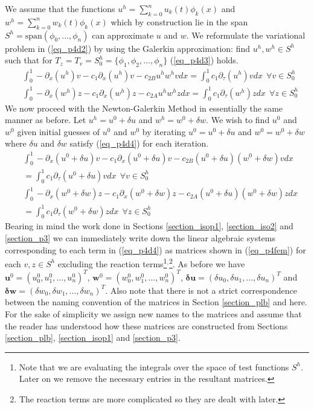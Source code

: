 \documentclass[11pt,fleqn]{article}
\theoremstyle{defstyle}
\begin{document}
We assume that the functions $u^h =\sum^n_{k=0} u_k(t) \phi_k(x)$ and $w^h =\sum^n_{k=0} w_k(t) \phi_k(x)$ which by construction lie in the span $S^h=\text{span}(\phi_0,...,\phi_n)$ can approximate $u$ and $w$. We reformulate the variational problem in (\ref{eq_p4d2}) by using the Galerkin approximation: find $u^h, w^h \in S^h$ such that for $T_z = T_v = S^h_0=\{\phi_1, \phi_2,...,\phi_n \}$ (\ref{eq_p4d3}) holds.
\begin{equation}
\begin{aligned}
&\int_0^1 -\partial_{x}(u^h)v - c_1\partial_x(u^h)v - c_{2B}u^hw^hvdx = \int_0^1 c_1\partial_\tau(u^h)v dx~~\forall v \in S^h_0 \\
&\int_0^1-\partial_{x}(w^h)z - c_1\partial_x(w^h)z - c_{2A}u^hw^hzdx = \int_0^1 c_1\partial_\tau(w^h)zdx~~\forall z \in S^h_0 
\end{aligned}
\label{eq_p4d3}
\end{equation}
We now proceed with the Newton-Galerkin Method in essentially the same manner as before. Let $u^h = u^0 + \delta u$ and $w^h=w^0 +\delta w$. We wish to find $u^0$ and $w^0$ given initial guesses of $u^0$ and $w^0$ by iterating $u^0 = u^0 + \delta u$ and $w^0=w^0+\delta w$ where $\delta u$ and $\delta w$ satisfy (\ref{eq_p4d4}) for each iteration.
\begin{equation}
\begin{aligned}
&\int_0^1 -\partial_{x}(u^0 + \delta u)v - c_1\partial_x(u^0 + \delta u)v - c_{2B}(u^0 + \delta u)(w^0 +\delta w)vdx \\ &= \int_0^1 c_1\partial_\tau(u^0 + \delta u)v dx ~~\forall v \in S^h_0 \\
&\int_0^1-\partial_{x}(w^0 +\delta w)z - c_1\partial_x(w^0 +\delta w)z - c_{2A}(u^0 + \delta u)(w^0 +\delta w)zdx  \\ &= \int_0^1 c_1\partial_\tau(w^0 +\delta w)zdx  ~~\forall z \in S^h_0
\end{aligned}
\label{eq_p4d4}
\end{equation}
Bearing in mind the work done in Sections \ref{section_isop1}, \ref{section_iso2} and \ref{section_p3} we can immediately write down the linear algebraic systems corresponding to each term in (\ref{eq_p4d4}) as matrices shown in (\ref{eq_p4fem}) for each $v,z \in S^h$ excluding the reaction terms\footnote{Note that we are evaluating the integrals over the space of test functions $S^h$. Later on we remove the necessary entries in the resultant matrices.}$^{,}$\footnote{The reaction terms are more complicated so they are dealt with later.}. As before we have $\mathbf{u}^0=\left(u^0_0,u^0_1,...,u^0_n\right)^T$, $\mathbf{w}^0=\left(w^0_0,w^0_1,...,w^0_n\right)^T$, $\mathbf{\delta u}=\left(\delta u_0,\delta u_1,...,\delta u_n\right)^T$ and $\mathbf{\delta w}=\left(\delta w_0,\delta w_1,...,\delta w_n\right)^T$. Also note that there is not a strict correspondence between the naming convention of the matrices in Section \ref{section_plb} and here. For the sake of simplicity we assign new names to the matrices and assume that the reader has understood how these matrices are constructed from Sections \ref{section_plb}, \ref{section_isop1} and \ref{section_p3}.
\end{document}
